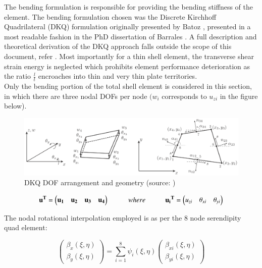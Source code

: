 The bending formulation is responsible for providing the bending stiffness of the element. The bending formulation chosen was the Discrete Kirchhoff Quadrilateral (DKQ) formulation  originally presented by Batoz \cite{Bat82}, presented in a most readable fashion in the PhD dissertation of Barrales \cite{Bar12}. A full description and theoretical derivation of the DKQ approach falls outside the scope of this document, refer \cite{Bat82}. Most importantly for a thin shell element, the transverse shear strain energy is neglected which prohibits element performance deterioration as the ratio $\frac{l}{t}$ encroaches into thin and very thin plate territories.\\

Only the bending portion of the total shell element is considered in this section, in which there are three nodal DOFs per node $(w_i$ corresponds to $u_{zi}$ in the figure below).

\begin{figure}[H]
	\centering
	\def\svgwidth{\columnwidth}
	\includegraphics[width=15cm]{images/8nodeseren.png}
	\caption{DKQ DOF arrangement and geometry (source: \cite{Bar12})}
	\label{8nodeseren}
\end{figure}

\begin{equation} 
\mathbf{u^T} = 
\begin{pmatrix}
\mathbf{u_1} & \mathbf{u_2} & \mathbf{u_3} & \mathbf{u_4}
\end{pmatrix} 
\hspace{10mm}
where
\hspace{10mm}
\mathbf{u{_i}^T} = 
\begin{pmatrix}
{u_{zi}} & {\theta_{xi}} & {\theta_{yi}}
\end{pmatrix}
\label{equationBending}
\end{equation}

The nodal rotational interpolation employed is as per the 8 node serendipity quad element:

\begin{equation} 
\begin{pmatrix}
\beta_x (\xi , \eta) \\
\beta_y (\xi , \eta)
\end{pmatrix}
= \sum_{i=1}^8 \psi_i (\xi , \eta) 
\begin{pmatrix}
\beta_{xi} (\xi , \eta) \\
\beta_{yi} (\xi , \eta)
\end{pmatrix}
\label{equation20}
\end{equation}

